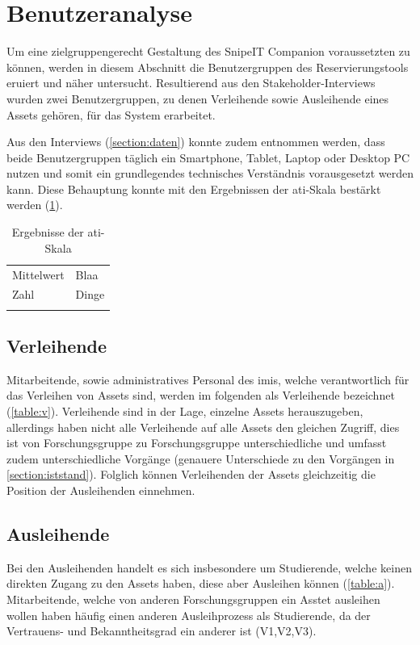 \section{Benutzeranalyse}
\label{section:benutzer}
Um eine zielgruppengerecht Gestaltung des SnipeIT Companion voraussetzten zu können, werden in
diesem Abschnitt die Benutzergruppen des Reservierungstools eruiert und näher untersucht.
Resultierend aus den Stakeholder-Interviews wurden zwei Benutzergruppen, zu denen Verleihende sowie
Ausleihende eines Assets gehören, für das System erarbeitet.

Aus den Interviews (\ref{section:daten}) konnte zudem entnommen werden, dass beide Benutzergruppen
täglich ein Smartphone, Tablet, Laptop oder Desktop PC nutzen und somit ein grundlegendes
technisches Verständnis vorausgesetzt werden kann. Diese Behauptung konnte mit den Ergebnissen der
\ac{ati}-Skala bestärkt werden (\ref{table:ati}).

\begin{table}[h]
        \centering
        \caption{Ergebnisse der \ac{ati}-Skala}
        \begin{tabular}{ll}
                \arrayrulecolor{maincolor}\hline
                \sffamily\color{maincolor}Mittelwert & \sffamily\color{maincolor}Blaa
                \\
                \arrayrulecolor{maincolor}\hline
                Zahl                                 & Dinge \\
                \arrayrulecolor{maincolor}\hline
        \end{tabular}
        \label{table:ati}
\end{table}


\subsection*{Verleihende}
Mitarbeitende, sowie administratives Personal des \ac{imis}, welche verantwortlich für das Verleihen
von Assets sind, werden im folgenden als Verleihende bezeichnet (\ref{table:v}). Verleihende sind in
der Lage, einzelne Assets herauszugeben, allerdings haben nicht alle Verleihende auf alle Assets den
gleichen Zugriff, dies ist von Forschungsgruppe zu Forschungsgruppe unterschiedliche und umfasst
zudem unterschiedliche Vorgänge (genauere Unterschiede zu den Vorgängen in \ref{section:iststand}).
Folglich können Verleihenden der Assets gleichzeitig die Position der Ausleihenden einnehmen.

\subsection*{Ausleihende}
Bei den Ausleihenden handelt es sich insbesondere um Studierende, welche keinen direkten Zugang zu
den Assets haben, diese aber Ausleihen können (\ref{table:a}). Mitarbeitende, welche von anderen
Forschungsgruppen ein Asstet ausleihen wollen haben häufig einen anderen Ausleihprozess als
Studierende, da der Vertrauens- und Bekanntheitsgrad ein anderer ist (V1,V2,V3).

